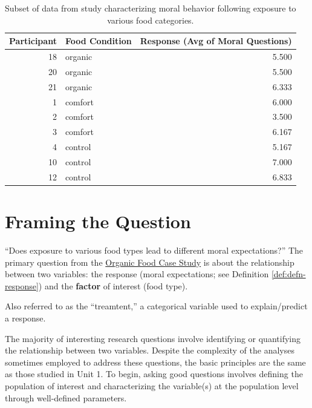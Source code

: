 \documentclass[]{book}
\theoremstyle{plain}
\theoremstyle{mydefn}
\theoremstyle{myexmpl}
\theoremstyle{remark}
\let\BeginKnitrBlock\begin \let\EndKnitrBlock\end
\let\BeginKnitrBlock\begin \let\EndKnitrBlock\end
\begin{document}
\begin{table}

\caption{\label{tab:caseorganic-table}Subset of data from study characterizing moral behavior following exposure to various food categories.}
\centering
\begin{tabular}[t]{r|l|r}
\hline
Participant & Food Condition & Response (Avg of Moral Questions)\\
\hline
18 & organic & 5.500\\
\hline
20 & organic & 5.500\\
\hline
21 & organic & 6.333\\
\hline
1 & comfort & 6.000\\
\hline
2 & comfort & 3.500\\
\hline
3 & comfort & 6.167\\
\hline
4 & control & 5.167\\
\hline
10 & control & 7.000\\
\hline
12 & control & 6.833\\
\hline
\end{tabular}
\end{table}

\chapter{Framing the Question}\label{ANOVAquestions}

``Does exposure to various food types lead to different moral
expectations?'' The primary question from the
\protect\hyperlink{CaseOrganic}{Organic Food Case Study} is about the
relationship between two variables: the response (moral expectations;
see Definition \ref{def:defn-response}) and the \textbf{factor} of
interest (food type).

\BeginKnitrBlock{definition}[Factor]
\protect\hypertarget{def:defn-factor}{}{\label{def:defn-factor}
{} }Also referred to as the ``treamtent,'' a
categorical variable used to explain/predict a response.
\EndKnitrBlock{definition}

The majority of interesting research questions involve identifying or
quantifying the relationship between two variables. Despite the
complexity of the analyses sometimes employed to address these
questions, the basic principles are the same as those studied in Unit 1.
To begin, asking good questions involves defining the population of
interest and characterizing the variable(s) at the population level
through well-defined parameters.
\end{document}
